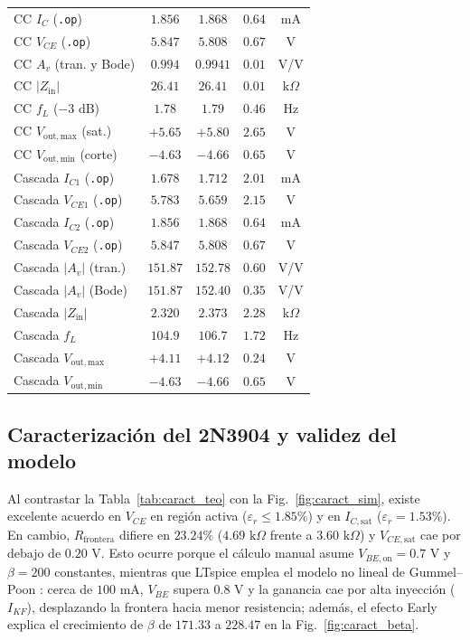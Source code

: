 \documentclass[conference]{IEEEtran}
\begin{document}
\begin{table}[htbp]
{\begin{tabular}{@{}lcccc@{}}
\midrule
CC $I_C$ (\texttt{.op}) & $1.856$ & $1.868$ & $0.64$ & mA \\
CC $V_{CE}$ (\texttt{.op}) & $5.847$ & $5.808$ & $0.67$ & V \\
CC $A_v$ (tran. y Bode) & $0.994$ & $0.9941$ & $0.01$ & V/V \\
CC $|Z_{\mathrm{in}}|$ & $26.41$ & $26.41$ & $0.01$ & k$\Omega$ \\
CC $f_L$ ($-3\text{ dB}$) & $1.78$ & $1.79$ & $0.46$ & Hz \\
CC $V_{\mathrm{out,max}}$ (sat.) & $+5.65$ & $+5.80$ & $2.65$ & V \\
CC $V_{\mathrm{out,min}}$ (corte) & $-4.63$ & $-4.66$ & $0.65$ & V \\
\midrule
Cascada $I_{C1}$ (\texttt{.op}) & $1.678$ & $1.712$ & $2.01$ & mA \\
Cascada $V_{CE1}$ (\texttt{.op}) & $5.783$ & $5.659$ & $2.15$ & V \\
Cascada $I_{C2}$ (\texttt{.op}) & $1.856$ & $1.868$ & $0.64$ & mA \\
Cascada $V_{CE2}$ (\texttt{.op}) & $5.847$ & $5.808$ & $0.67$ & V \\
Cascada $|A_v|$ (tran.) & $151.87$ & $152.78$ & $0.60$ & V/V \\
Cascada $|A_v|$ (Bode) & $151.87$ & $152.40$ & $0.35$ & V/V \\
Cascada $|Z_{\mathrm{in}}|$ & $2.320$ & $2.373$ & $2.28$ & k$\Omega$ \\
Cascada $f_L$ & $104.9$ & $106.7$ & $1.72$ & Hz \\
Cascada $V_{\mathrm{out,max}}$ & $+4.11$ & $+4.12$ & $0.24$ & V \\
Cascada $V_{\mathrm{out,min}}$ & $-4.63$ & $-4.66$ & $0.65$ & V \\
\bottomrule
\end{tabular}%
}
\end{table}

\subsection{Caracterizaci\'on del 2N3904 y validez del modelo}

Al contrastar la Tabla~\ref{tab:caract_teo} con la Fig.~\ref{fig:caract_sim}, existe excelente acuerdo en $V_{CE}$ en regi\'on activa ($\varepsilon_r \le 1.85\%$) y en $I_{C,\mathrm{sat}}$ ($\varepsilon_r = 1.53\%$). En cambio, $R_{\mathrm{frontera}}$ difiere en $23.24\%$ ($4.69\text{ k}\Omega$ frente a $3.60\text{ k}\Omega$) y $V_{CE,\mathrm{sat}}$ cae por debajo de $0.20\text{ V}$. Esto ocurre porque el c\'alculo manual asume $V_{BE,\mathrm{on}} = 0.7\text{ V}$ y $\beta = 200$ constantes, mientras que LTspice emplea el modelo no lineal de Gummel--Poon \cite{sedra2020}: cerca de $100\text{ mA}$, $V_{BE}$ supera $0.8\text{ V}$ y la ganancia cae por alta inyecci\'on ($I_{KF}$), desplazando la frontera hacia menor resistencia; adem\'as, el efecto Early explica el crecimiento de $\beta$ de $171.33$ a $228.47$ en la Fig.~\ref{fig:caract_beta}.
\end{document}
